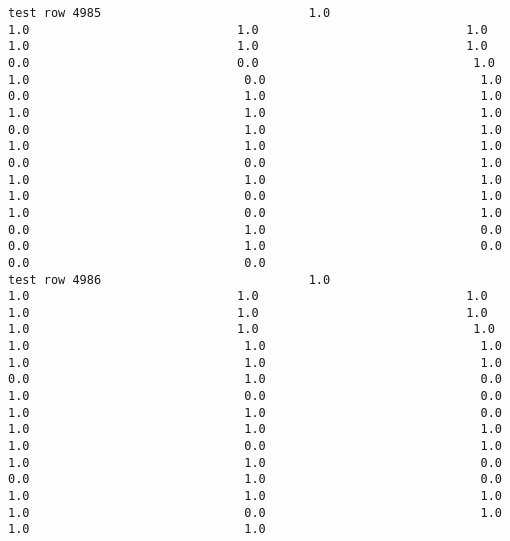 \documentclass[11pt]{article}
\begin{document}
\begin{verbatim}
test row 4985                             1.0                             1.0                             1.0                             1.0                             1.0                             1.0                             1.0                             0.0                             0.0                              1.0                              1.0                              0.0                              1.0                              0.0                              1.0                              1.0                              1.0                              1.0                              1.0                              0.0                              1.0                              1.0                              1.0                              1.0                              1.0                              0.0                              0.0                              1.0                              1.0                              1.0                              1.0                              1.0                              0.0                              1.0                              1.0                              0.0                              1.0                              0.0                              1.0                              0.0                              0.0                              1.0                              0.0                              0.0                              0.0
test row 4986                             1.0                             1.0                             1.0                             1.0                             1.0                             1.0                             1.0                             1.0                             1.0                              1.0                              1.0                              1.0                              1.0                              1.0                              1.0                              1.0                              0.0                              1.0                              0.0                              1.0                              0.0                              0.0                              1.0                              1.0                              0.0                              1.0                              1.0                              1.0                              1.0                              0.0                              1.0                              1.0                              1.0                              0.0                              0.0                              1.0                              0.0                              1.0                              1.0                              1.0                              1.0                              0.0                              1.0                              1.0                              1.0

\end{verbatim}
\end{document}
